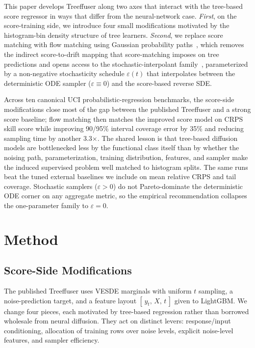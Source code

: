 \documentclass{uai2026}
\begin{document}
This paper develops Treeffuser along two axes that interact with the tree-based score regressor in ways that differ from the neural-network case. \emph{First}, on the score-training side, we introduce four small modifications motivated by the histogram-bin density structure of tree learners. \emph{Second}, we replace score matching with flow matching using Gaussian probability paths~\citep{lipman2023flow,liu2023rectified}, which removes the indirect score-to-drift mapping that score-matching imposes on tree predictions and opens access to the stochastic-interpolant family~\citep{albergo2023stochastic}, parameterized by a non-negative stochasticity schedule $\varepsilon(t)$ that interpolates between the deterministic ODE sampler ($\varepsilon \equiv 0$) and the score-based reverse SDE.

Across ten canonical UCI probabilistic-regression benchmarks, the score-side modifications close most of the gap between the published Treeffuser and a strong score baseline; flow matching then matches the improved score model on CRPS skill score while improving 90/95\% interval coverage error by 35\% and reducing sampling time by another 3.3$\times$. The shared lesson is that tree-based diffusion models are bottlenecked less by the functional class itself than by whether the noising path, parameterization, training distribution, features, and sampler make the induced supervised problem well matched to histogram splits. The same runs beat the tuned external baselines we include on mean relative CRPS and tail coverage. Stochastic samplers ($\varepsilon > 0$) do not Pareto-dominate the deterministic ODE corner on any aggregate metric, so the empirical recommendation collapses the one-parameter family to $\varepsilon = 0$.

\section{Method}\label{sec:method}

\subsection{Score-Side Modifications}\label{sec:score-side}
The published Treeffuser uses VESDE marginals with uniform $t$ sampling, a noise-prediction target, and a feature layout $[\,y_t,\,X,\,t\,]$ given to LightGBM. We change four pieces, each motivated by tree-based regression rather than borrowed wholesale from neural diffusion. They act on distinct levers: response/input conditioning, allocation of training rows over noise levels, explicit noise-level features, and sampler efficiency.
\end{document}
